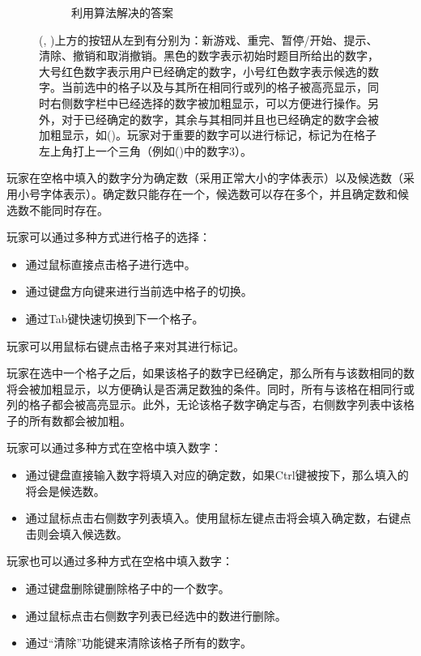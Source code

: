 \documentclass[11pt,a4paper]{article}
\begin{document}
\begin{figure}[H]
\begin{subfigure}{.45\textwidth}
		\caption{利用算法解决的答案} \label{fig:sudoku-4d}
	\end{subfigure}
	\caption{(, )上方的按钮从左到有分别为：新游戏、重完、暂停/开始、提示、清除、撤销和取消撤销。黑色的数字表示初始时题目所给出的数字，大号红色数字表示用户已经确定的数字，小号红色数字表示候选的数字。当前选中的格子以及与其所在相同行或列的格子被高亮显示，同时右侧数字栏中已经选择的数字被加粗显示，可以方便进行操作。另外，对于已经确定的数字，其余与其相同并且也已经确定的数字会被加粗显示，如()。玩家对于重要的数字可以进行标记，标记为在格子左上角打上一个三角（例如()中的数字3）。}
\end{figure}

玩家在空格中填入的数字分为确定数（采用正常大小的字体表示）以及候选数（采用小号字体表示）。确定数只能存在一个，候选数可以存在多个，并且确定数和候选数不能同时存在。

玩家可以通过多种方式进行格子的选择：
\begin{itemize}
	\item 通过鼠标直接点击格子进行选中。
	\item 通过键盘方向键来进行当前选中格子的切换。
	\item 通过Tab键快速切换到下一个格子。
\end{itemize}

玩家可以用鼠标右键点击格子来对其进行标记。

玩家在选中一个格子之后，如果该格子的数字已经确定，那么所有与该数相同的数将会被加粗显示，以方便确认是否满足数独的条件。同时，所有与该格在相同行或列的格子都会被高亮显示。此外，无论该格子数字确定与否，右侧数字列表中该格子的所有数都会被加粗。

玩家可以通过多种方式在空格中填入数字：
\begin{itemize}
	\item 通过键盘直接输入数字将填入对应的确定数，如果Ctrl键被按下，那么填入的将会是候选数。
	\item 通过鼠标点击右侧数字列表填入。使用鼠标左键点击将会填入确定数，右键点击则会填入候选数。
\end{itemize}

玩家也可以通过多种方式在空格中填入数字：
\begin{itemize}
	\item 通过键盘删除键删除格子中的一个数字。
	\item 通过鼠标点击右侧数字列表已经选中的数进行删除。
	\item 通过“清除”功能键来清除该格子所有的数字。
\end{itemize}
\end{document}
